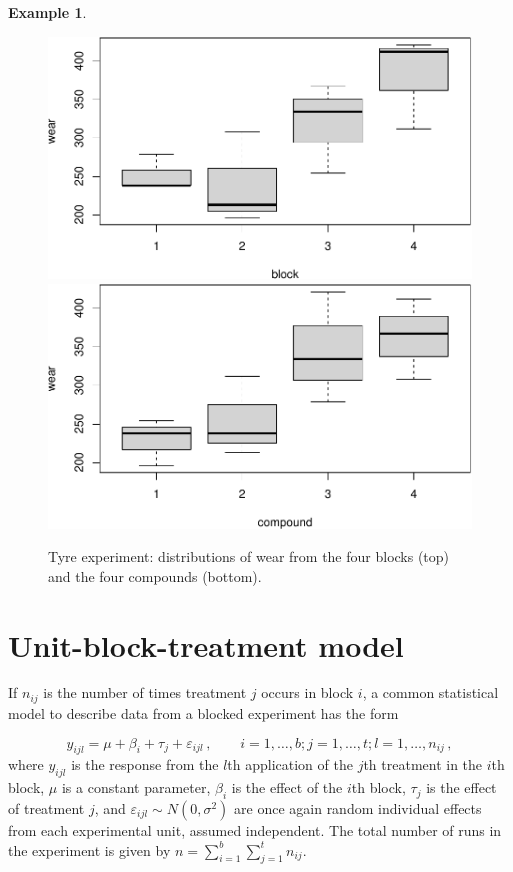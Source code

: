 \documentclass[
]{book}
\theoremstyle{definition}
\theoremstyle{definition}
\newtheorem{example}{Example}[chapter]
\theoremstyle{definition}
\theoremstyle{definition}
\theoremstyle{remark}
\begin{document}
\begin{example}
\begin{figure}
{\centering \includegraphics{bookdown_math3014-6027_files/figure-latex/tyre-expt-boxplots-1} \includegraphics{bookdown_math3014-6027_files/figure-latex/tyre-expt-boxplots-2} 

}

\caption{Tyre experiment: distributions of wear from the four blocks (top) and the four compounds (bottom).}\label{fig:tyre-expt-boxplots}
\end{figure}

\end{example}

\hypertarget{unit-block-treatment-model}{%
\section{Unit-block-treatment model}\label{unit-block-treatment-model}}

If \(n_{ij}\) is the number of times treatment \(j\) occurs in block \(i\), a common statistical model to describe data from a blocked experiment has the form

\begin{equation}
y_{ijl} = \mu + \beta_i + \tau_j + \varepsilon_{ijl}\,, \qquad i = 1,\ldots, b; j = 1, \ldots, t; l = 1,\ldots,n_{ij}\,,
\label{eq:block-model}
\end{equation}
where \(y_{ijl}\) is the response from the \(l\)th application of the \(j\)th treatment in the \(i\)th block, \(\mu\) is a constant parameter, \(\beta_i\) is the effect of the \(i\)th block, \(\tau_j\) is the effect of treatment \(j\), and \(\varepsilon_{ijl}\sim N(0, \sigma^2)\) are once again random individual effects from each experimental unit, assumed independent. The total number of runs in the experiment is given by \(n = \sum_{i=1}^b\sum_{j=1}^t n_{ij}\).
\end{document}
